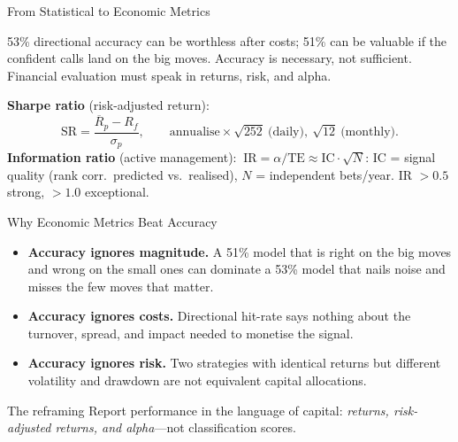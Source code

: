 \documentclass[9pt,t]{beamer}
\begin{document}
\begin{frame}{From Statistical to Economic Metrics}
\begin{bigpicture}
53\% directional accuracy can be worthless after costs; 51\% can be valuable if
the confident calls land on the big moves. Accuracy is necessary, not
sufficient. Financial evaluation must speak in returns, risk, and alpha.
\end{bigpicture}

\medskip
\begin{underhood}
\textbf{Sharpe ratio} (risk-adjusted return):
\[
  \text{SR} = \frac{\overline{R}_p - R_f}{\sigma_p},
  \qquad \text{annualise} \times\sqrt{252}\ \text{(daily)},\ \sqrt{12}\ \text{(monthly)}.
\]
\textbf{Information ratio} (active management):
\(\ \text{IR} = \alpha/\text{TE} \approx \text{IC}\cdot\sqrt{N}\):
$\text{IC}$ = signal quality (rank corr.\ predicted vs.\ realised), $N$ =
independent bets/year. IR $>0.5$ strong, $>1.0$ exceptional.
\end{underhood}
\end{frame}

\begin{frame}{Why Economic Metrics Beat Accuracy}
\begin{itemize}\itemsep3pt
  \item \textbf{Accuracy ignores magnitude.} A 51\% model that is right on the
        big moves and wrong on the small ones can dominate a 53\% model that
        nails noise and misses the few moves that matter.
  \item \textbf{Accuracy ignores costs.} Directional hit-rate says nothing
        about the turnover, spread, and impact needed to monetise the signal.
  \item \textbf{Accuracy ignores risk.} Two strategies with identical returns
        but different volatility and drawdown are not equivalent capital
        allocations.
\end{itemize}

\medskip
\begin{block}{The reframing}
Report performance in the language of capital: \emph{returns, risk-adjusted
returns, and alpha}---not classification scores.
\end{block}
\end{frame}
\end{document}
